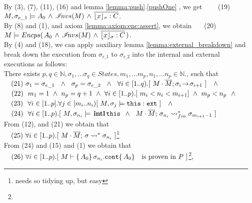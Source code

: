 \begin{description}
\\
By (3), (7), (11), (16) and lemma  \ref{lemma:push}.\ref{pushOne} , we get \ \ \ \  (19) $M, \sigma_{e\_1} \models  {  A_0} \,   \wedge \,  {{\mathcal I}\!nvs(M)} \, \wedge \, 
\overline{ {\lfloor x \rfloor_{\sigma}} : C}$.
\\
By (8) and (1), and axiom \ref{lemma:axiom:enc:assert}, we obtain \ \ \ (20) \ $M \models {\ensuremath Encps(\, {  A_0} \,   \wedge \,  {\ensuremath{{\mathcal I}\!nvs(M)}} \, \wedge \, 
\overline{ {\lfloor x \rfloor_{\sigma}} : C}\, )}$.
\\
By (4) and (18), we can apply auxiliary lemma 
\ref{lemma:external_breakdown} and break down the execution from $\sigma_{e\_1}$ to  $\sigma_{e\_2}$ into the internal and external executions as follows:
\\
There exists $ p,q\in \mathbb{N},  \sigma_1, ... \sigma_q \in States, m_1,...m_p, n_1, ... n_p \in \mathbb{N}.$, such that \\ 
$\ \strut \ \ (21) \ \sigma_1=\sigma_{e\_1} \ \ \wedge\ \  \sigma_p=\sigma_{e\_2}\ \  \wedge\ \ \forall i\in [1..q).[\   \leadstoOrig {M\cdot \Mtwo}  {\sigma_i}  {\sigma_{i+1}}\  ] \  \ \ \wedge$\\
$\ \strut \ \ (22) \ \ m_1=1 \ \wedge\ n_p=q+1 \  \wedge\ \forall i\in[1..p).[  \  m_i < n_i < m_{i+1}  ] \ \wedge \ m_p<n_p\ \ \wedge  $\\
$\ \strut \ \ (23) \ \ \forall i\in[1..p].\forall j\in [m_i..n_i)[\   M,\sigma_j \models \texttt{this}:\mbox{\normalfont{\texttt{ext}}} \ ] \  \ \ \wedge$\\
$\ \strut \ \ (24) \ \ \forall i\in[1..p). [ \ M,\sigma_{n_i} \models \internal {\texttt{this}}   \ \wedge \ \ 
 \leadstoBoundedStarFin {M\cdot \Mtwo}  {\sigma_{n_{i}}}  {\sigma_{m_{i+1}-1}} \ ] $ \\
From (12), and (21) we obtain that\\
$\ \strut \ \ (25)\   \forall i\in[1..p). [ \ \leadstoBoundedStar {M\cdot \Mtwo}  {\sigma} {\sigma_{n_{i}}} \ ]$\footnote{needs so tidying up, but easy}
\\
From  (24) and (15) and (1) we obtain that\\
$\ \strut \ \ (26)\ \forall i\in[1..p). [ \ M\vdash \{ \, A_0  \}\, {\sigma_{n_{i}}.\prg{cont}}  \{ \, A_0 \}\ \  \mbox{ is proven in } P \ ]$\footnote{}, \\

\end{description}
